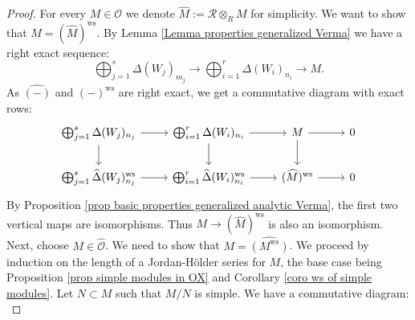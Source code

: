 \documentclass{amsart}
\newcommand{\OX}{\mathcal{O}}
\begin{document}
\begin{proof}
For every $M\in \OX$ we denote  $\widehat{M}:=\mathscr{R}\otimes_{R}M$ for simplicity. We want to show that $M=(\widehat{M})^{\operatorname{ws}}$. By Lemma \ref{Lemma properties generalized Verma} we have a right exact sequence:
\begin{equation*}
    \bigoplus_{j=1}^s\Delta(W_j)_{m_j}\rightarrow \bigoplus_{i=1}^r\Delta(W_i)_{n_i}\rightarrow M.
\end{equation*}
As $\widehat{(-)}$ and $(-)^{\operatorname{ws}}$ are right exact, we get a commutative diagram with exact rows:
\begin{equation*}
\begin{tikzcd}
\bigoplus_{j=1}^s\Delta(W_j)_{n_j} \arrow[r] \arrow[d] & \bigoplus_{i=1}^r\Delta(W_i)_{n_i} \arrow[r] \arrow[d] & M \arrow[r] \arrow[d]                       & 0 \\
\bigoplus_{j=1}^s\widehat{\Delta}(W_j)^{\operatorname{ws}}_{n_j} \arrow[r]           & \bigoplus_{i=1}^r\widehat{\Delta}(W_i)^{\operatorname{ws}}_{n_i} \arrow[r]           & (\widehat{M})^{\operatorname{ws}} \arrow[r] & 0
\end{tikzcd}
\end{equation*}
By Proposition \ref{prop basic properties generalized analytic Verma}, the first two vertical maps are isomorphisms. Thus $M\rightarrow (\widehat{M})^{\operatorname{ws}}$ is also an isomorphism. Next, choose $M\in \widehat{\OX}$. We need to show that $M=\widehat{(M^{\operatorname{ws}})}$. We proceed by induction on the length of a Jordan-Hölder series for $M$, the base case being Proposition \ref{prop simple modules in OX} and Corollary \ref{coro ws of simple modules}. Let $N\subset M$ such that $M/N$ is simple. We have a commutative diagram:
\begin{equation*}

\end{equation*}
\end{proof}
\end{document}
